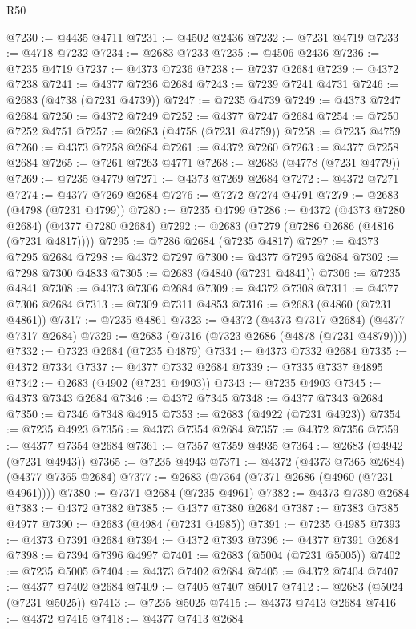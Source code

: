 \begin{lexlean}{R50}
\begin{coremodule}
@7230 := @4435 @4711
@7231 := @4502 @2436
@7232 := @7231 @4719
@7233 := @4718 @7232
@7234 := @2683 @7233
@7235 := @4506 @2436
@7236 := @7235 @4719
@7237 := @4373 @7236
@7238 := @7237 @2684
@7239 := @4372 @7238
@7241 := @4377 @7236 @2684
@7243 := @7239 @7241 @4731
@7246 := @2683 (@4738 (@7231 @4739))
@7247 := @7235 @4739
@7249 := @4373 @7247 @2684
@7250 := @4372 @7249
@7252 := @4377 @7247 @2684
@7254 := @7250 @7252 @4751
@7257 := @2683 (@4758 (@7231 @4759))
@7258 := @7235 @4759
@7260 := @4373 @7258 @2684
@7261 := @4372 @7260
@7263 := @4377 @7258 @2684
@7265 := @7261 @7263 @4771
@7268 := @2683 (@4778 (@7231 @4779))
@7269 := @7235 @4779
@7271 := @4373 @7269 @2684
@7272 := @4372 @7271
@7274 := @4377 @7269 @2684
@7276 := @7272 @7274 @4791
@7279 := @2683 (@4798 (@7231 @4799))
@7280 := @7235 @4799
@7286 := @4372 (@4373 @7280 @2684) (@4377 @7280 @2684)
@7292 := @2683 (@7279 (@7286 @2686 (@4816 (@7231 @4817))))
@7295 := @7286 @2684 (@7235 @4817)
@7297 := @4373 @7295 @2684
@7298 := @4372 @7297
@7300 := @4377 @7295 @2684
@7302 := @7298 @7300 @4833
@7305 := @2683 (@4840 (@7231 @4841))
@7306 := @7235 @4841
@7308 := @4373 @7306 @2684
@7309 := @4372 @7308
@7311 := @4377 @7306 @2684
@7313 := @7309 @7311 @4853
@7316 := @2683 (@4860 (@7231 @4861))
@7317 := @7235 @4861
@7323 := @4372 (@4373 @7317 @2684) (@4377 @7317 @2684)
@7329 := @2683 (@7316 (@7323 @2686 (@4878 (@7231 @4879))))
@7332 := @7323 @2684 (@7235 @4879)
@7334 := @4373 @7332 @2684
@7335 := @4372 @7334
@7337 := @4377 @7332 @2684
@7339 := @7335 @7337 @4895
@7342 := @2683 (@4902 (@7231 @4903))
@7343 := @7235 @4903
@7345 := @4373 @7343 @2684
@7346 := @4372 @7345
@7348 := @4377 @7343 @2684
@7350 := @7346 @7348 @4915
@7353 := @2683 (@4922 (@7231 @4923))
@7354 := @7235 @4923
@7356 := @4373 @7354 @2684
@7357 := @4372 @7356
@7359 := @4377 @7354 @2684
@7361 := @7357 @7359 @4935
@7364 := @2683 (@4942 (@7231 @4943))
@7365 := @7235 @4943
@7371 := @4372 (@4373 @7365 @2684) (@4377 @7365 @2684)
@7377 := @2683 (@7364 (@7371 @2686 (@4960 (@7231 @4961))))
@7380 := @7371 @2684 (@7235 @4961)
@7382 := @4373 @7380 @2684
@7383 := @4372 @7382
@7385 := @4377 @7380 @2684
@7387 := @7383 @7385 @4977
@7390 := @2683 (@4984 (@7231 @4985))
@7391 := @7235 @4985
@7393 := @4373 @7391 @2684
@7394 := @4372 @7393
@7396 := @4377 @7391 @2684
@7398 := @7394 @7396 @4997
@7401 := @2683 (@5004 (@7231 @5005))
@7402 := @7235 @5005
@7404 := @4373 @7402 @2684
@7405 := @4372 @7404
@7407 := @4377 @7402 @2684
@7409 := @7405 @7407 @5017
@7412 := @2683 (@5024 (@7231 @5025))
@7413 := @7235 @5025
@7415 := @4373 @7413 @2684
@7416 := @4372 @7415
@7418 := @4377 @7413 @2684

\end{coremodule}
\end{lexlean}
